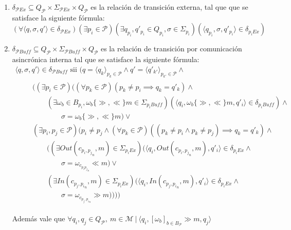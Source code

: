\begin{definition}[Composición]
\begin{itemize}
\begin{enumerate}
\item $\delta_{\mathcal{P}\mathit{Ex}} \subseteq Q_{\mathcal{P}} \times \Sigma_{\mathcal{P}\mathit{Ex}} \times Q_{\mathcal{P}}$ es la relación de transición externa, tal que que se satisface la siguiente fórmula: $$(\forall \langle q, \sigma, q' \rangle \in \delta_{\mathcal{P}\mathit{Ex}}) (\exists p_i \in \mathcal{P})(\exists q_{p_i},q'_{p_i} \in Q_{p_i}, \sigma \in \Sigma_{p_i}) (\langle q_{p_i},\sigma,q'_{p_i} \rangle \in \delta_{p_i Ex})$$

\item $\delta_{\mathcal{P}\mathit{Buff}} \subseteq Q_{\mathcal{P}} \times \Sigma_{\mathcal{P} \mathit{Buff}} \times Q_{\mathcal{P}}$ es la relación de transición por comunicación asincrónica interna tal que se satisface la siguiente fórmula:
$$
\begin{array}{l}
\langle q, \sigma, q' \rangle \in \delta_{\mathcal{P}\mathit{Buff}} \mbox{ sii } (q = \langle q_k \rangle_{p_k \in \mathcal{P}} \land q' = \langle q'_{k'} \rangle_{p_{k'} \in \mathcal{P}} \land\\
\qquad
\begin{array}{l}
((\exists p_i \in \mathcal{P})((\forall p_k \in \mathcal{P})(p_k \neq p_i \implies q_k = q'_k) \land \\
\qquad(\exists \omega_b \in B_{p_i}, \omega_b \{\gg, \ll\} m \in \Sigma_{{p_i} \mathit{Buff}})(\langle q_i, \omega_b \{\gg, \ll\} m, q'_i \rangle \in \delta_{p_i \mathit{Buff}}) \land\\
\qquad\qquad \sigma = \omega_b \{\gg, \ll\} m)\lor\\
(\exists p_i, p_j \in \mathcal{P})(p_i \neq p_j \land (\forall p_k \in \mathcal{P})((p_k \neq p_i \land p_k \neq p_j) \implies q_k = q'_k) \land \\ 
\qquad ((\exists \mathit{Out}(c_{{p_i, p_j}_n}, m) \in \Sigma_{{p_i} \mathit{Ex}})(\langle q_i, \mathit{Out}(c_{{p_i, p_j}_n}, m), q'_i \rangle \in \delta_{p_i  \mathit{Ex}} \land\\
\qquad\qquad \sigma = \omega_{c_{{p_i p_j}_n}} \ll m) \lor \\ 
\qquad (\exists \mathit{In}(c_{p_j,{p_i}_n}, m) \in \Sigma_{{p_i} \mathit{Ex}})(\langle q_i, \mathit{In}(c_{p_j,{p_i}_n}, m), q'_i \rangle \in \delta_{p_i \mathit{Ex}} \land\\
\qquad\qquad \sigma = \omega_{c_{p_j,{p_i}_n}} \gg m))))
\end{array}
\end{array}
 $$
 
Además vale que $\forall q_i,q_j \in Q_\mathit{\mathcal{P}}, \ m \in \mathcal{M} \ |	 \ \langle q_i, [\omega_\mathit{b}]_{b \in B_\mathcal{P}} \gg m, q_j \rangle$


\end{enumerate}
\end{itemize}
\end{definition}
